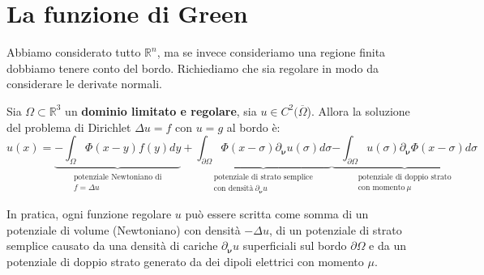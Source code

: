 \documentclass[10pt,a4paper,twoside,openright]{book}
\begin{document}
\section{La funzione di Green}
Abbiamo considerato tutto $\mathbb{R} ^{n} $, ma se invece consideriamo una regione finita dobbiamo tenere conto del bordo. Richiediamo che sia regolare in modo da considerare le derivate normali.
\begin{theorem}
	Sia $\displaystyle \Omega \subset \mathbb{R}^{3}$ un \textbf{dominio limitato e regolare}, sia $\displaystyle u\in C^{2}(\overline{\Omega }$). Allora la soluzione del problema di Dirichlet $\Delta u=f$ con $u=g$ al bordo è:
	\begin{equation*}
		u(x) =\underbrace{-\int _{\Omega } \Phi (x-y) f(y) dy}_{ \begin{array}{l}
			\text{potenziale Newtoniano di}\\
			f=\Delta u
			\end{array}} +\underbrace{\int _{\partial \Omega } \Phi (x-\sigma) \partial _{\bm{\nu}} u(\sigma) d\sigma }_{ \begin{array}{l}
			\text{potenziale di strato semplice}\\
			\text{con densità} \ \partial _{\bm{\nu}} u
			\end{array}}\underbrace{-\int _{\partial \Omega } u(\sigma) \partial _{\bm{\nu}} \Phi (x-\sigma) d\sigma }_{ \begin{array}{l}
			\text{potenziale di doppio strato}\\
			\text{con momento} \ \mu 
			\end{array}}
	\end{equation*}
\end{theorem}
In pratica, ogni funzione regolare $\displaystyle u$ può essere scritta come somma di un potenziale di volume (Newtoniano) con densità $\displaystyle -\Delta u$, di un potenziale di strato semplice causato da una densità di cariche $\displaystyle \partial _{\bm{\nu}} u$ superficiali sul bordo $\displaystyle \partial \Omega $ e da un potenziale di doppio strato generato da dei dipoli elettrici con momento $\displaystyle \mu $.
\end{document}
